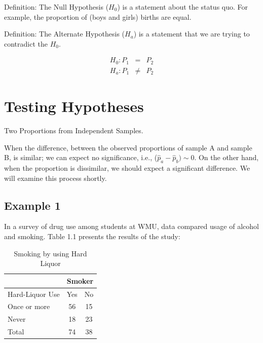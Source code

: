 \documentclass[11pt, chapterprefix=true]{scrbook}\usepackage[]{graphicx}\usepackage[]{color}
\begin{document}
Definition: The Null Hypothesis ($H_0$) is a statement about the status quo.  For example,  the proportion of (boys and girls) births are equal.

Definition: The Alternate Hypothesis ($H_a$) is a statement that we are trying to contradict the $H_0$.

\begin{eqnarray*}
  H_0: P_1 &=& P_2 \\
  H_a: P_1 &\ne& P_2 
\end{eqnarray*}  

\section{Testing Hypotheses } Two Proportions from Independent Samples.

When the difference, between the observed proportions of sample A and sample B, is similar; we can expect no significance, i.e., ($\hat{p}_a - \hat{p}_b) \sim 0$.  On the other hand, when the proportion is dissimilar, we should expect a significant difference.  We will examine this process shortly.

\subsection{Example 1}

In a survey of drug use among students at WMU, data compared usage of alcohol and smoking. Table 1.1 presents the results of the study:

\begin{table}[htbp]
   \centering
   \begin{tabular}{@{} lcc @{}} \hline %
     &  \multicolumn{2}{c}{Smoker} \\ \hline 
     Hard-Liquor Use & Yes & No \\ \hline
     Once or more & 56 & 15 \\
     Never        & 18 & 23 \\  \hline
     Total        & 74 & 38 \\ \hline
   \end{tabular}
   \caption{Smoking by using Hard Liquor}
   \label{tab:c10_1}
\end{table}
\end{document}
